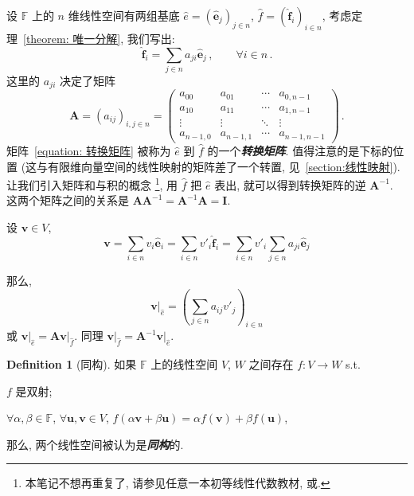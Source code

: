 \documentclass[openany]{ctexbook}
\newcommand*{\indexbf}[1]{\emph{\textbf{#1}}\index{#1}} %
\theoremstyle{plain}
\theoremstyle{definition}
\newtheorem{definition}{Definition}[section] %
\newcommand*{\basis}[1]{\hat{\boldsymbol{#1}}} %
\newcommand*{\bv}{\boldsymbol} %
\newcommand*{\inbasis}[2]{\left.%
	{#1}\right|_{#2}
}
\begin{document}
设 $\mathbb F$ 上的 $n$ 维线性空间有两组基底 $\hat e = (\basis e_j)_{j \in n}$, $\hat f = (\basis f_i)_{i \in n}$, 考虑定理~\ref{theorem: 唯一分解}, 我们写出:
\begin{equation}
	\basis f_i = \sum_{j \in n} a_{ji} \basis e_j\,,
	\qquad
	\forall i \in n\,.
\end{equation}
这里的 $a_{ji}$ 决定了矩阵
\begin{equation}\label{equation: 转换矩阵}
	\bv A = (a_{ij})_{i,j \in n} =
	\begin{pmatrix}
		a_{00} & a_{01} & \cdots & a_{0, n-1} \\
		a_{10} & a_{11} & \cdots & a_{1, n-1} \\
		\vdots & \vdots & \ddots & \vdots     \\
		a_{n-1, 0} & a_{n-1, 1} & \cdots & a_{n-1, n-1}
	\end{pmatrix}\,.
\end{equation}
矩阵~\eqref{equation: 转换矩阵} 被称为 $\hat e$ 到 $\hat f$ 的一个\indexbf{转换矩阵}. 值得注意的是下标的位置 (这与有限维向量空间的线性映射的矩阵差了一个转置, 见~\ref{section:线性映射}). 让我们引入矩阵和与积的概念%
\footnote{本笔记不想再重复了, 请参见任意一本初等线性代数教材, 或\cite{kostrikin1982introduction}. },
用 $\hat f$ 把 $\hat e$ 表出, 就可以得到转换矩阵的逆 $\bv A^{-1}$. 
这两个矩阵之间的关系是 $\bv A \bv A^{-1} = \bv A^{-1} \bv A = \bv I$.

设 $\bv v \in V$, 
\begin{equation*}
	\bv v = \sum_{i \in n} v_i \basis e_i
	= \sum_{i \in n} v'_i \basis f_i
	= \sum_{i \in n} v'_i \sum_{j \in n} a_{ji} \basis e_j
\end{equation*}

那么, 
\begin{equation*}
	\inbasis{\bv v}{\hat e} = \left( 
		\sum_{j \in n} a_{ij} v'_j 
 \right)_{i \in n}
\end{equation*}
或 $\inbasis{\bv v}{\hat e} = \bv A \inbasis{\bv v}{\hat f}$. 同理 $\inbasis{\bv v}{\hat f} = \bv A^{-1} \inbasis{\bv v}{\hat e}$. 

\begin{definition}[同构]
	如果 $\mathbb F$ 上的线性空间 $V$, $W$ 之间存在 $f \colon V \to W$ s.t.\ 
	\begin{conditionlist}
		\item $f$ 是双射;
		\item $\forall \alpha, \beta \in \mathbb F$, $\forall \bv u, \bv v \in V$, $f(\alpha \bv v + \beta \bv u) = \alpha f(\bv v) + \beta f(\bv u)$,
	\end{conditionlist}
	那么, 两个线性空间被认为是\indexbf{同构}的.
\end{definition}
\end{document}
